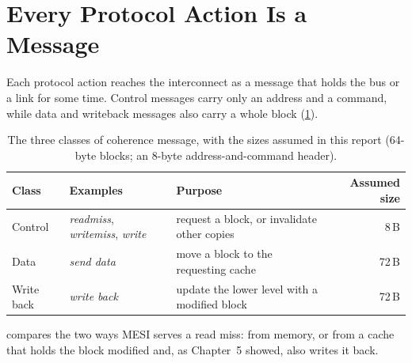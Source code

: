 \section{Every Protocol Action Is a Message}
\label{sec:orig-messages}
\label{sec:orig-count}
%

Each protocol action reaches the interconnect as a message that holds the bus or
a link for some time. Control messages carry only an address and a command, while
data and writeback messages also carry a whole block (\cref{tab:msg-classes}).

\begin{table}[htbp]
\centering
\caption{The three classes of coherence message, with the sizes assumed in
this report (64-byte blocks; an 8-byte address-and-command header).}
\label{tab:msg-classes}
\small
\begin{tabular}{@{}l l p{4.6cm} r@{}}
\toprule
Class & Examples & Purpose & Assumed size \\
\midrule
Control & \textit{readmiss}, \textit{writemiss}, \textit{write} &
  request a block, or invalidate other copies & 8\,B \\
Data & \textit{send data} & move a block to the requesting cache & 72\,B \\
Write back & \textit{write back} & update the lower level with a modified block & 72\,B \\
\bottomrule
\end{tabular}
\end{table}

 compares the two ways MESI serves a read miss: from
memory, or from a cache that holds the block modified and, as Chapter~5 showed,
also writes it back.


